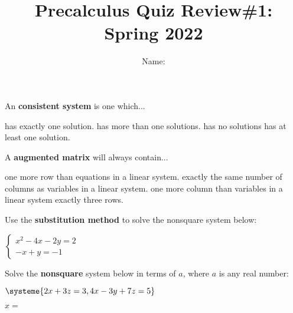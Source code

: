 \documentclass{exam}
\title{Precalculus Quiz Review\#1: Spring 2022  }
\author{  Name:   }
\begin{document}
\maketitle
\thispagestyle{empty}

\begin{questions}
\question 

\begin{multicols}{2}
An \textbf{consistent system} is one  which... 

\columnbreak
\begin{choices}
\choice has exactly one solution.
\choice has more than one solutions.
\choice has no solutions
\choice has at least one solution.
\end{choices}

\end{multicols}



\question
\begin{multicols}{2}
A \textbf{augmented matrix} will always contain...

\columnbreak

\begin{choices}
\choice one more row than equations in a linear system.
\choice exactly the same number of columns as variables in a linear system.
\choice one more column than variables in a linear system
\choice  exactly three rows.
\end{choices}
\end{multicols}


\question 
\label{two}
Use the \textbf{ substitution method} to solve the nonsquare system below:

$
\begin{cases}
x^2 -4x - 2y = 2 \\
-x + y = -1
\end{cases}
$



\newpage


\question



\begin{multicols}{2}
Solve the \textbf{nonsquare} system below in terms of $a$, where $a$ is any real number:

$
\systeme{
2x + 3z = 3,
4x - 3y    + 7z = 5
}
$
\columnbreak


\hspace{2cm}$x = $ \fillin \\


\end{multicols}
\end{questions}
\end{document}
